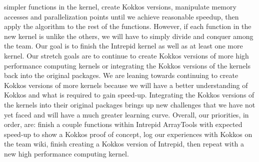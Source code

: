 \documentclass{hmcclinic}
\begin{document}
simpler functions in the kernel, create Kokkos versions, manipulate memory accesses and 
parallelization points until we achieve reasonable speedup, then apply the algorithm to the rest 
of the functions. However, if each function in the new kernel is unlike the others, we will have 
to simply divide and conquer among the team. Our goal is to finish the Intrepid kernel as well as
at least one more kernel. Our stretch goals are to continue to create Kokkos versions of more high
performance computing kernels or integrating the Kokkos versions of the kernels back into the 
original packages. We are leaning towards continuing to create Kokkos versions of more kernels 
because we will have a better understanding of Kokkos and what is required to gain speed-up. 
Integrating the Kokkos versions of the kernels into their original packages brings up new 
challenges that we have not yet faced and will have a much greater learning curve. Overall, our 
priorities, in order, are: finish a couple functions within Intrepid ArrayTools with expected 
speed-up to show a Kokkos proof of concept, log our experiences with Kokkos on the team wiki, 
finish creating a Kokkos version of Intrepid, then repeat with a new high performance computing kernel.
\end{document}
